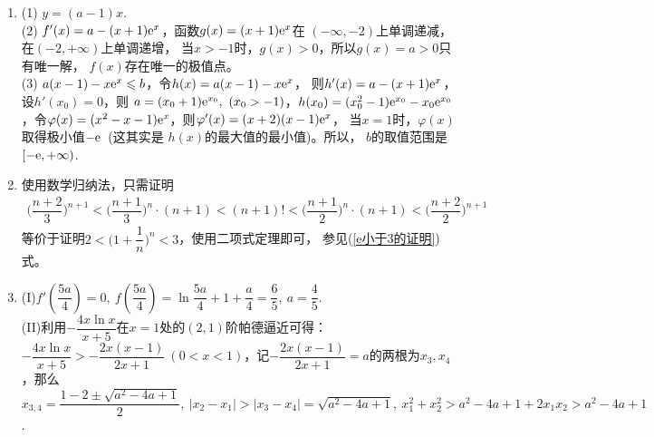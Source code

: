 \begin{enumerate}[label={\textbf{\arabic*.}},leftmargin=
    \inteval{\myenumleftmargin}pt]
用MATLAB提供的ode45(四阶五步龙格-库塔(Runge-Kutta)方法)数值求解本题微分方程的代码如下：
\begin{lstlisting}
    [x1,y1]=ode45(@(x,y) exp(x)./x.^3-2*y./x, [2,0.3], exp(2)/8);
    [x2,y2]=ode45(@(x,y) exp(x)./x.^3-2*y./x, [2,10],  exp(2)/8);
    plot([flipud(x1);x2],[flipud(y1);y2],'k','Linewidth',1.2)
    grid minor
\end{lstlisting} 
绘制的图像如下：
\begin{figure}[!htbp]
    \centering
    \texttt{[image: 2013辽宁高考微分方程]}
\end{figure}

\item (1) $ y=(a-1)x $. \\
(2) $ f'(x)=a-(x+1)\mathrm{e}^x $，函数$ g(x)=(x+1)\mathrm{e}^x $在
$ (-\infty,-2) $上单调递减，在$ (-2,+\infty) $上单调递增，
当$ x>-1 $时，$ g(x)>0 $，所以$ g(x)=a>0 $只有唯一解，
$ f(x) $存在唯一的极值点。\\
(3) $ a(x-1)-x\mathrm{e}^x\leqslant b $，令$ h(x)=a(x-1)-x\mathrm{e}^x $，
则$ h'(x)=a-(x+1)\mathrm{e}^x $，设$ h'(x_0)=0 $，则
$ a=(x_0+1)\e^{x_0},\ (x_0>-1) $，$ h(x_0)=(x_0^2-1)
\mathrm{e}^{x_0}-x_0\mathrm{e}^{x_0} $，令$ \varphi(x)=(x^2-x-1)
\mathrm{e}^{x} $，则$ \varphi'(x)=(x+2)(x-1)\mathrm{e}^x $，
当$ x=1 $时，$ \varphi(x) $取得极小值$ -\mathrm{e} $\, (这其实是
$ h(x) $的最大值的最小值)。所以，
$ b $的取值范围是$ [-\mathrm{e},+\infty) $.

\item 
使用数学归纳法，只需证明
\begin{gather*}
    \Big(\dfrac{n+2}{3}\Big)^{n+1}<\Big(\dfrac{n+1}{3}\Big)^{n}
    \cdot (n+1)<(n+1)!<\Big(\dfrac{n+1}{2}\Big)^{n}\cdot (n+1)<\Big(\dfrac{n+2}{2}\Big)^{n+1}
\end{gather*}
等价于证明$ 2<\Big(1+\dfrac{1}{n}\Big)^{n}<3 $，使用二项式定理即可，
参见(\ref{e小于3的证明})式。

\item 
(I)$ f'(\dfrac{5a}{4})=0,\ f(\dfrac{5a}{4})=\ln \dfrac{5a}{4}+1+\dfrac{a}{4}=\dfrac{6}{5},\ a=\dfrac{4}{5} $.\\
(II)利用$ -\dfrac{4x\ln x}{x+5} $在$ x=1 $处的$ (2,1) $阶帕德逼近可得：$ -\dfrac{4x\ln x}{x+5}>-\dfrac{2x(x-1)}{2x+1}\ (0<x<1) $，记$ -\dfrac{2x(x-1)}{2x+1}=a $的两根为$ x_3,x_4 $，那么$ x_{3,4}=\dfrac{1-2\pm \sqrt{a^2-4a+1}}{2},\  |x_2-x_1|>|x_3-x_4|=\sqrt{a^2-4a+1},\ x_1^2+x_2^2>a^2-4a+1+2x_1x_2>a^2-4a+1 $.


\end{enumerate}
